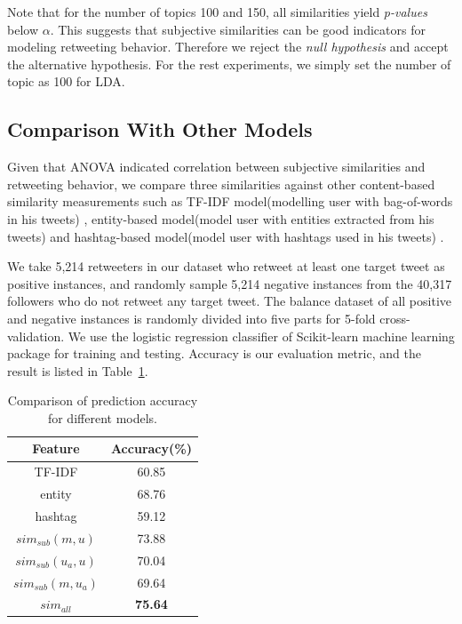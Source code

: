 \documentclass[letterpaper]{article}
\begin{document}
Note that for the number of topics 100 and 150, all similarities yield \textit{p-values} below $ \alpha $. This suggests that subjective similarities can be good indicators for modeling retweeting behavior. 
Therefore we reject the \textit{null hypothesis} and accept the alternative hypothesis.
For the rest experiments, we simply set the number of topic as 100 for LDA. 

\subsection{Comparison With Other Models}
\label{Comparison}

Given that ANOVA indicated correlation between subjective similarities and retweeting behavior, we compare three similarities against other content-based similarity measurements such as TF-IDF model(modelling user with bag-of-words in his tweets) \cite{Luo:2013RMF}, entity-based model(model user with entities extracted from his tweets) and hashtag-based model(model user with hashtags used in his tweets) \cite{Abel:2011AUM}.

We take 5,214 retweeters in our dataset who retweet at least one target tweet as positive instances, and randomly sample 5,214 negative instances from the 40,317 followers who do not retweet any target tweet.
The balance dataset of all positive and negative instances is randomly divided into five parts for 5-fold cross-validation. 
We use the logistic regression classifier of Scikit-learn machine learning package \cite{scikit-learn} for training and testing.
Accuracy is our evaluation metric, and the result is listed in Table~\ref{tab3}.
\begin{table}[h]
\centering
\caption{Comparison of prediction accuracy for different models. }
\label{tab3}
\begin{tabular}{|c|c|}
\hline
Feature & Accuracy(\%) \\
\hline
TF-IDF & 60.85  \\
entity & 68.76 \\
hashtag & 59.12  \\
$ sim_{sub} \left( m,u \right) $ & 73.88\\
$ sim_{sub}\left( u_{a},u \right)  $ & 70.04\\
$ sim_{sub}\left( m,u_{a} \right)  $ &69.64\\
$ sim_{all}  $ &\textbf{75.64}\\
\hline
\end{tabular}
\end{table}
\end{document}
